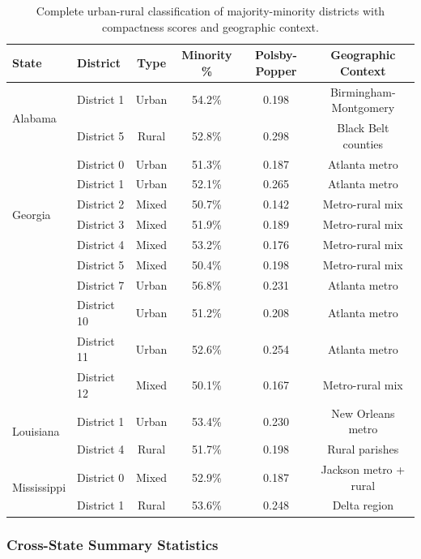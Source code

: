 \begin{table}[h]
\centering
\small
\begin{tabular}{llcccc}
\toprule
\textbf{State} & \textbf{District} & \textbf{Type} & \textbf{Minority \%} & \textbf{Polsby-Popper} & \textbf{Geographic Context} \\
\midrule
\multirow{2}{*}{Alabama} & District 1 & Urban & 54.2\% & 0.198 & Birmingham-Montgomery \\
& District 5 & Rural & 52.8\% & 0.298 & Black Belt counties \\
\midrule
\multirow{6}{*}{Georgia} & District 0 & Urban & 51.3\% & 0.187 & Atlanta metro \\
& District 1 & Urban & 52.1\% & 0.265 & Atlanta metro \\
& District 2 & Mixed & 50.7\% & 0.142 & Metro-rural mix \\
& District 3 & Mixed & 51.9\% & 0.189 & Metro-rural mix \\
& District 4 & Mixed & 53.2\% & 0.176 & Metro-rural mix \\
& District 5 & Mixed & 50.4\% & 0.198 & Metro-rural mix \\
& District 7 & Urban & 56.8\% & 0.231 & Atlanta metro \\
& District 10 & Urban & 51.2\% & 0.208 & Atlanta metro \\
& District 11 & Urban & 52.6\% & 0.254 & Atlanta metro \\
& District 12 & Mixed & 50.1\% & 0.167 & Metro-rural mix \\
\midrule
\multirow{2}{*}{Louisiana} & District 1 & Urban & 53.4\% & 0.230 & New Orleans metro \\
& District 4 & Rural & 51.7\% & 0.198 & Rural parishes \\
\midrule
\multirow{2}{*}{Mississippi} & District 0 & Mixed & 52.9\% & 0.187 & Jackson metro + rural \\
& District 1 & Rural & 53.6\% & 0.248 & Delta region \\
\bottomrule
\end{tabular}
\caption{Complete urban-rural classification of majority-minority districts with compactness scores and geographic context.}
\end{table}

\subsubsection{Cross-State Summary Statistics}

